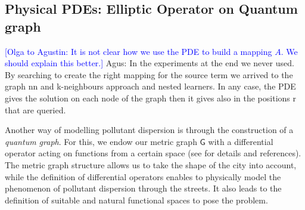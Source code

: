 \documentclass[11pt,a4paper,twoside]{article}
\newcommand{\ascomment}[1]{{\color{teal} Agus: #1}}
\theoremstyle{definition}
\numberwithin{equation}{section}
\newcommand{\G}{\ensuremath{\textsf{G}}} %
\newcommand{\<}{\langle}
\renewcommand{\>}{\rangle}
\newcommand{\om}[1]{\textcolor{blue}{#1}}
\begin{document}
\subsection{Physical PDEs: Elliptic Operator on Quantum graph}
\label{sec:PDE}
\om{[Olga to Agustin: It is not clear how we use the PDE to build a mapping $A$. We should explain this better.]}
\ascomment{In the experiments at the end we never used. By searching to create the right mapping for the source term we arrived to the graph nn and k-neighbours approach and nested learners. In any case, the PDE gives the solution on each node of the graph then it gives also in the positions r that are queried.}

Another way of modelling pollutant dispersion is through the construction of a \emph{quantum graph}. For this, we endow our metric graph $\G$ with a differential operator acting on functions from a certain space (see \cite{BK2013} for details and references). The metric graph structure allows us to take the shape of the city into account, while the definition of differential operators enables to physically model the phenomenon of pollutant dispersion through the streets. It also leads to the definition of suitable and natural functional spaces to pose the problem.

\end{document}
